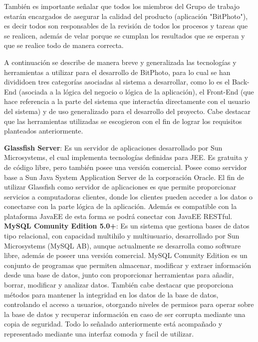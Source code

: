 \documentclass{memoria}
\begin{document}
También es importante señalar que todos los miembros del Grupo de trabajo estarán encargados de asegurar la calidad del producto (aplicación "BitPhoto"), es decir todos son responsables de la revisión de todos los procesos y tareas que se realicen, además de velar porque se cumplan los resultados que se esperan y que se realice todo de manera correcta.

\newpage


A continuación se describe de manera breve y generalizada las tecnologías y herramientas a utilizar para el desarrollo de BitPhoto, para lo cual se han divididoen tres categorías asociadas al sistema a desarrollar, como lo es el Back-End (asociada a la lógica del negocio o lógica de la aplicación), el Front-End (que hace referencia a la parte del sistema que interactúa directamente con el usuario del sistema) y de uso generalizado para el desarrollo del proyecto.  Cabe destacar que las herramientas utilizadas se escogieron con el fin de lograr los requisitos planteados anteriormente.\\


\textbf{Glassfish Server}: Es un servidor de aplicaciones desarrollado por Sun Microsystems, el cual implementa tecnologías definidas para JEE. Es gratuita y de código libre, pero también posee una versión comercial. Posee como servidor base a Sun Java System Application Server de la corporación Oracle. El fin de utilizar Glassfish como servidor de aplicaciones es que permite proporcionar servicios a computadoras clientes, donde los clientes pueden acceder a los datos o conectarse con la parte lógica de la aplicación. Además es compatible con la plataforma JavaEE de esta forma se podrá conectar con JavaEE RESTful.\\

\textbf{MySQL Comunity Edition 5.0+}: Es un sistema que gestiona bases de datos tipo relacional, con capacidad multihilo y multiusuario, desarrollado por Sun Microsystems (MySQL AB), aunque actualmente se desarrolla como software libre, además de poseer una versión comercial. MySQL Comunity Edition es un conjunto de programas que permiten almacenar, modificar y extraer información desde una base de datos, junto con proporcionar herramientas para añadir, borrar, modificar y analizar datos. También cabe destacar que proporciona métodos para mantener la integridad en los datos de la base de datos, controlando el acceso a usuarios, otorgando niveles de permisos para operar sobre la base de datos y recuperar información en caso de ser corrupta mediante una copia de seguridad. Todo lo señalado anteriormente está acompañado y representado mediante una interfaz comoda y facil de utilizar.\\
\end{document}
